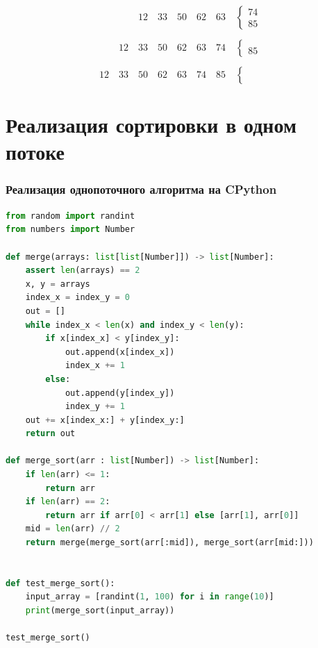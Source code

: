 \documentclass{beamer}
\begin{document}
	\begin{frame}
		\begin{equation}
			\phantom{00}\quad\phantom{00}\quad12\quad33\quad50\quad62\quad63\quad\left\{
			\begin{matrix}
				74 \\
				85
			\end{matrix}
			\right.
		\end{equation}
	
		\begin{equation}
			\phantom{00}\quad12\quad33\quad50\quad62\quad63\quad74\quad\left\{
			\begin{matrix}
				\\
				85
			\end{matrix}
			\right.
		\end{equation}
	
		\begin{equation}
			12\quad33\quad50\quad62\quad63\quad74\quad85\quad\left\{
			\begin{matrix}
				\\
				\phantom{00}
			\end{matrix}
			\right.
		\end{equation}
	\end{frame}

	

	\section{Реализация сортировки в одном потоке}
	\begin{frame}[fragile]
		\frametitle{Реализация однопоточного алгоритма на CPython}
		
		\begin{lstlisting}[language=Python, basicstyle=\tiny]
from random import randint
from numbers import Number

def merge(arrays: list[list[Number]]) -> list[Number]:
	assert len(arrays) == 2
	x, y = arrays
	index_x = index_y = 0
	out = []
	while index_x < len(x) and index_y < len(y):
		if x[index_x] < y[index_y]:
			out.append(x[index_x])
			index_x += 1
		else:
			out.append(y[index_y])
			index_y += 1
	out += x[index_x:] + y[index_y:]
	return out

def merge_sort(arr : list[Number]) -> list[Number]:
	if len(arr) <= 1:
		return arr
	if len(arr) == 2:
		return arr if arr[0] < arr[1] else [arr[1], arr[0]]
	mid = len(arr) // 2
	return merge(merge_sort(arr[:mid]), merge_sort(arr[mid:]))


def test_merge_sort():
	input_array = [randint(1, 100) for i in range(10)]
	print(merge_sort(input_array))

test_merge_sort()
		\end{lstlisting}
		
	\end{frame}
\end{document}
